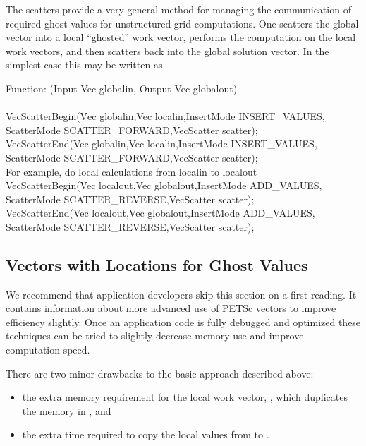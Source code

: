 The scatters provide a very general method for managing the communication of 
required ghost values for unstructured grid computations. One scatters
the global vector into a local ``ghosted'' work vector, performs the computation
on the local work vectors, and then scatters back into the global solution 
vector. In the simplest case this may be written as
\begin{tabbing}
   Function: (Input Vec globalin, Output Vec globalout)\\
\\
  VecScatterBegin(\=Vec globalin,Vec localin,InsertMode INSERT\_VALUES,\\
                 \>         ScatterMode SCATTER\_FORWARD,VecScatter scatter);\\
  VecScatterEnd(Vec globalin,Vec localin,InsertMode INSERT\_VALUES,\\
                 \>       ScatterMode SCATTER\_FORWARD,VecScatter scatter);\\
  \trl{/*} For example, do local calculations from localin to localout \trl{*/} \\
  VecScatterBegin(Vec localout,Vec globalout,InsertMode ADD\_VALUES,\\
                 \>         ScatterMode SCATTER\_REVERSE,VecScatter scatter);\\
  VecScatterEnd(Vec localout,Vec globalout,InsertMode ADD\_VALUES,\\
                 \>       ScatterMode SCATTER\_REVERSE,VecScatter scatter);
\end{tabbing}

\subsection{Vectors with Locations for Ghost Values}

We recommend that application developers skip this section on a first reading.
It contains information about more advanced use of PETSc vectors to improve 
efficiency slightly. Once an application code is fully debugged and optimized
these techniques can be tried to slightly decrease memory use and improve 
computation speed.


There are two minor drawbacks to the basic approach described above:
\begin{itemize}
\item the extra memory requirement for the local work vector, , which
      duplicates the memory in , and
\item the extra time required to copy the local values from  to 
      .
\end{itemize}

